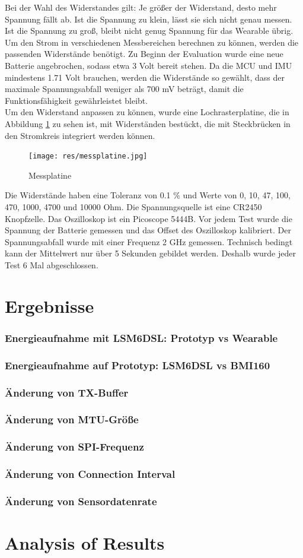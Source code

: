 Bei der Wahl des Widerstandes gilt: Je größer der Widerstand, desto mehr Spannung fällt ab.
Ist die Spannung zu klein, lässt sie sich nicht genau messen.
Ist die Spannung zu groß, bleibt nicht genug Spannung für das Wearable übrig.
Um den Strom in verschiedenen Messbereichen berechnen zu können, werden die passenden Widerstände benötigt.
Zu Beginn der Evaluation wurde eine neue Batterie angebrochen, sodass etwa 3 Volt bereit stehen.
Da die MCU und IMU mindestens 1.71 Volt brauchen, werden die Widerstände so gewählt, dass der maximale Spannungsabfall weniger als 700 mV beträgt, damit die Funktionsfähigkeit gewährleistet bleibt.\\
Um den Widerstand anpassen zu können, wurde eine Lochrasterplatine, die in Abbildung \ref{fig:messplatine} zu sehen ist, mit Widerständen bestückt, die mit Steckbrücken in den Stromkreis integriert werden können.
\begin{figure}[hbtp]
	\centering
	\texttt{[image: res/messplatine.jpg]}
	\caption{Messplatine}
	\label{fig:messplatine}
\end{figure}
Die Widerstände haben eine Toleranz von 0.1 \% und Werte von 0, 10, 47, 100, 470, 1000, 4700 und 10000 Ohm.
Die Spannungsquelle ist eine CR2450 Knopfzelle.
Das Oszilloskop ist ein Picoscope 5444B.
Vor jedem Test wurde die Spannung der Batterie gemessen und das Offset des Oszilloskop kalibriert.
Der Spannungsabfall wurde mit einer Frequenz 2 GHz gemessen.
Technisch bedingt kann der Mittelwert nur über 5 Sekunden gebildet werden.
Deshalb wurde jeder Test 6 Mal abgeschlossen.

\section{Ergebnisse}
\subsubsection{Energieaufnahme mit LSM6DSL: Prototyp vs Wearable}
\subsubsection{Energieaufnahme auf Prototyp: LSM6DSL vs BMI160}
\subsubsection{Änderung von TX-Buffer}
\subsubsection{Änderung von MTU-Größe}
\subsubsection{Änderung von SPI-Frequenz}
\subsubsection{Änderung von Connection Interval}
\subsubsection{Änderung von Sensordatenrate}

\section{Analysis of Results}
